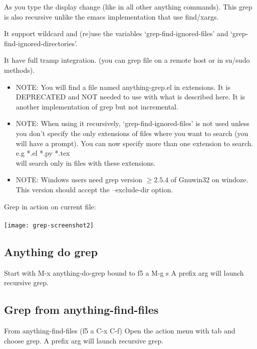 \documentclass[a4paper,11pt]{article}
\begin{document}
As you type the display change (like in all other anything commands).
This grep is also recursive unlike the emacs implementation that use find/xargs.

It support wildcard and (re)use the variables `grep-find-ignored-files'
and `grep-find-ignored-directories'.

It have full tramp integration.
(you can grep file on a remote host or in su/sudo methods).

\begin{itemize}
\item NOTE: 
You will find a file named anything-grep.el in extensions.
It is DEPRECATED and NOT needed to use with what is described here.
It is another implementation of grep but not incremental.
\end{itemize}


\begin{itemize}
\item NOTE:
When using it recursively, `grep-find-ignored-files' is not used unless you don't specify
the only extensions of files where you want to search (you will have a prompt).
You can now specify more than one extension to search.\\
e.g *.el *.py *.tex \\
will search only in files with these extensions.
\end{itemize}

\begin{itemize}
\item NOTE: Windows users need grep version 
\begin{math}
\geq2.5.4
\end{math}
of Gnuwin32 on windoze.
This version should accept the --exclude-dir option.
\end{itemize}

\newpage
Grep in action on current file: \\
\\
\texttt{[image: grep-screenshot2]}

\subsection{Anything do grep}
\label{sec:anything-do-grep}
Start with M-x anything-do-grep bound to f5 a M-g s
A prefix arg will launch recursive grep.

\subsection{Grep from anything-find-files}
\label{sec:grep-from-anything}
From anything-find-files (f5 a C-x C-f) Open the action menu with tab and choose grep.
A prefix arg will launch recursive grep.\\
\end{document}
